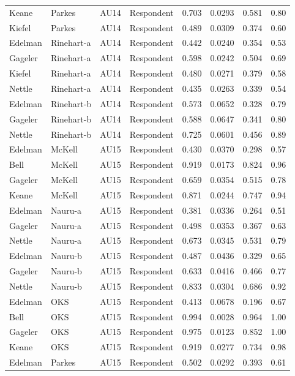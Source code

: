 \documentclass{monashthesis}
\begin{document}
\begin{center}
\begin{longtable}{llllllll}
Keane & Parkes & AU14 & Respondent & 0.703 & 0.0293 & 0.581 & 0.80 \\
Kiefel & Parkes & AU14 & Respondent & 0.489 & 0.0309 & 0.374 & 0.60 \\
Edelman & Rinehart-a & AU14 & Respondent & 0.442 & 0.0240 & 0.354 & 0.53 \\
Gageler & Rinehart-a & AU14 & Respondent & 0.598 & 0.0242 & 0.504 & 0.69 \\
Kiefel & Rinehart-a & AU14 & Respondent & 0.480 & 0.0271 & 0.379 & 0.58 \\
Nettle & Rinehart-a & AU14 & Respondent & 0.435 & 0.0263 & 0.339 & 0.54 \\
Edelman & Rinehart-b & AU14 & Respondent & 0.573 & 0.0652 & 0.328 & 0.79 \\
Gageler & Rinehart-b & AU14 & Respondent & 0.588 & 0.0647 & 0.341 & 0.80 \\
Nettle & Rinehart-b & AU14 & Respondent & 0.725 & 0.0601 & 0.456 & 0.89 \\
Edelman & McKell & AU15 & Respondent & 0.430 & 0.0370 & 0.298 & 0.57 \\
Bell & McKell & AU15 & Respondent & 0.919 & 0.0173 & 0.824 & 0.96 \\
Gageler & McKell & AU15 & Respondent & 0.659 & 0.0354 & 0.515 & 0.78 \\
Keane & McKell & AU15 & Respondent & 0.871 & 0.0244 & 0.747 & 0.94 \\
Edelman & Nauru-a & AU15 & Respondent & 0.381 & 0.0336 & 0.264 & 0.51 \\
Gageler & Nauru-a & AU15 & Respondent & 0.498 & 0.0353 & 0.367 & 0.63 \\
Nettle & Nauru-a & AU15 & Respondent & 0.673 & 0.0345 & 0.531 & 0.79 \\
Edelman & Nauru-b & AU15 & Respondent & 0.487 & 0.0436 & 0.329 & 0.65 \\
Gageler & Nauru-b & AU15 & Respondent & 0.633 & 0.0416 & 0.466 & 0.77 \\
Nettle & Nauru-b & AU15 & Respondent & 0.833 & 0.0304 & 0.686 & 0.92 \\
Edelman & OKS & AU15 & Respondent & 0.413 & 0.0678 & 0.196 & 0.67 \\
Bell & OKS & AU15 & Respondent & 0.994 & 0.0028 & 0.964 & 1.00 \\
Gageler & OKS & AU15 & Respondent & 0.975 & 0.0123 & 0.852 & 1.00 \\
Keane & OKS & AU15 & Respondent & 0.919 & 0.0277 & 0.734 & 0.98 \\
Edelman & Parkes & AU15 & Respondent & 0.502 & 0.0292 & 0.393 & 0.61 \\

\end{longtable}
\end{center}
\end{document}
